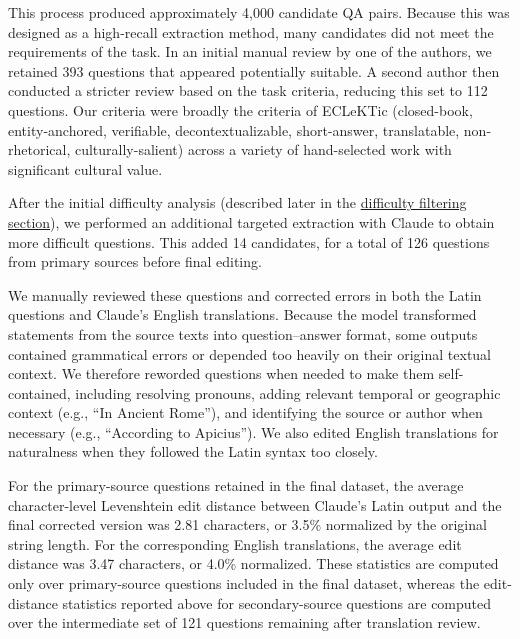 \documentclass[11pt]{article}
\newcommand{\mhcomment}[1]{\textcolor{blue}{\bf \small [ #1 --MH]}}
\begin{document}
This process produced approximately 4,000 candidate QA pairs. Because this was designed as a high-recall extraction method, many candidates did not meet the requirements of the task. In an initial manual review by one of the authors, we retained 393 questions that appeared potentially suitable. A second author then conducted a stricter review based on the task criteria, reducing this set to 112 questions. Our criteria were broadly the criteria of ECLeKTic (closed-book, entity-anchored, verifiable, decontextualizable, short-answer, translatable, non-rhetorical, culturally-salient) across a variety of hand-selected work with significant cultural value.

After the initial difficulty analysis (described later in the
\hyperref[sec:difficulty_filtering]{difficulty filtering section}), we performed an additional targeted extraction with Claude to obtain more difficult questions. This added 14 candidates, for a total of 126 questions from primary sources before final editing.

We manually reviewed these questions and corrected errors in both the Latin questions and Claude's English translations. Because the model transformed statements from the source texts into question--answer format, some outputs contained grammatical errors or depended too heavily on their original textual context. We therefore reworded questions when needed to make them self-contained, including resolving pronouns, adding relevant temporal or geographic context (e.g., ``In Ancient Rome''), and identifying the source or author when necessary (e.g., ``According to Apicius''). We also edited English translations for naturalness when they followed the Latin syntax too closely.

For the primary-source questions retained in the final dataset, the average character-level Levenshtein edit distance between Claude's Latin output and the final corrected version was 2.81 characters, or 3.5\% normalized by the original string length. For the corresponding English translations, the average edit distance was 3.47 characters, or 4.0\% normalized. These statistics are computed only over primary-source questions included in the final dataset, whereas the edit-distance statistics reported above for secondary-source questions are computed over the intermediate set of 121 questions remaining after translation review.
\end{document}
